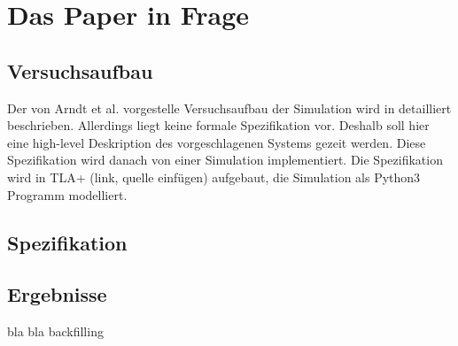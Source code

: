 \chapter{Das Paper in Frage}
\label{chap:ein}

\section{Versuchsaufbau}
Der von Arndt et al. vorgestelle Versuchsaufbau der Simulation wird in \cite{Arn99} detailliert beschrieben. Allerdings liegt keine formale Spezifikation vor. Deshalb soll hier eine high-level Deskription des vorgeschlagenen Systems gezeit werden. Diese Spezifikation wird danach von einer Simulation implementiert. Die Spezifikation wird in TLA+ (link,  quelle einfügen) aufgebaut, die Simulation als Python3 Programm modelliert.

\section{Spezifikation}

\section{Ergebnisse}
bla bla backfilling